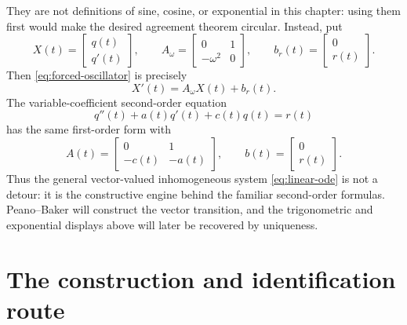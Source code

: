 They are not definitions of sine, cosine, or exponential in this chapter:
using them first would make the desired agreement theorem circular.  Instead,
put
\[
 X(t)=
 \begin{bmatrix}q(t)\\q'(t)\end{bmatrix},
 \qquad
 A_\omega=
 \begin{bmatrix}0&1\\-\omega^2&0\end{bmatrix},
 \qquad
 b_r(t)=
 \begin{bmatrix}0\\r(t)\end{bmatrix}.
\]
Then \eqref{eq:forced-oscillator} is precisely
\[
 X'(t)=A_\omega X(t)+b_r(t).
\]
The variable-coefficient second-order equation
\[
 q''(t)+a(t)q'(t)+c(t)q(t)=r(t)
\]
has the same first-order form with
\[
 A(t)=
 \begin{bmatrix}0&1\\-c(t)&-a(t)\end{bmatrix},
 \qquad
 b(t)=
 \begin{bmatrix}0\\r(t)\end{bmatrix}.
\]
Thus the general vector-valued inhomogeneous system \eqref{eq:linear-ode}
is not a detour: it is the constructive engine behind the familiar
second-order formulas.  Peano--Baker will construct the vector transition,
and the trigonometric and exponential displays above will later be recovered
by uniqueness.

\section{The construction and identification route}
\label{sec:ode-construction-identification-route}

